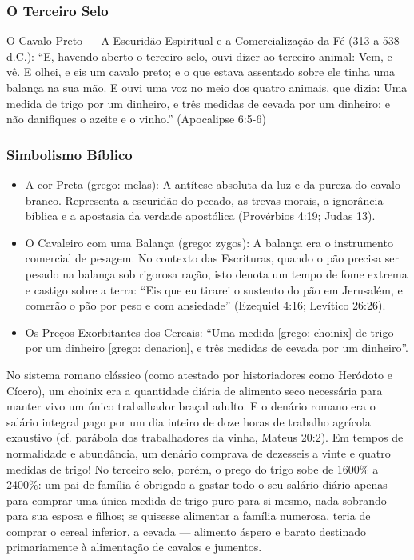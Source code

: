 \subsubsection*{O Terceiro Selo}
O Cavalo Preto — A Escuridão Espiritual e a Comercialização da Fé (313 a 538 d.C.):
``E, havendo aberto o terceiro selo, ouvi dizer ao terceiro animal: Vem, e vê. E olhei, e eis um cavalo preto; e o que estava assentado sobre ele tinha uma balança na sua mão. E ouvi uma voz no meio dos quatro animais, que dizia: Uma medida de trigo por um dinheiro, e três medidas de cevada por um dinheiro; e não danifiques o azeite e o vinho.'' (Apocalipse 6:5-6)


\subsubsection*{Simbolismo Bíblico}
\begin{itemize}
  \item A cor Preta (grego: melas): A antítese absoluta da luz e da pureza do cavalo branco. Representa a escuridão do pecado, as trevas morais, a ignorância bíblica e a apostasia da verdade apostólica (Provérbios 4:19; Judas 13).
  \item O Cavaleiro com uma Balança (grego: zygos): A balança era o instrumento comercial de pesagem. No contexto das Escrituras, quando o pão precisa ser pesado na balança sob rigorosa ração, isto denota um tempo de fome extrema e castigo sobre a terra: ``Eis que eu tirarei o sustento do pão em Jerusalém, e comerão o pão por peso e com ansiedade'' (Ezequiel 4:16; Levítico 26:26).
  \item Os Preços Exorbitantes dos Cereais: ``Uma medida [grego: choinix] de trigo por um dinheiro [grego: denarion], e três medidas de cevada por um dinheiro''.
\end{itemize}

No sistema romano clássico (como atestado por historiadores como Heródoto e Cícero), um choinix era a quantidade diária de alimento seco necessária para manter vivo um único trabalhador braçal adulto. E o denário romano era o salário integral pago por um dia inteiro de doze horas de trabalho agrícola exaustivo (cf. parábola dos trabalhadores da vinha, Mateus 20:2). Em tempos de normalidade e abundância, um denário comprava de dezesseis a vinte e quatro medidas de trigo! No terceiro selo, porém, o preço do trigo sobe de 1600\% a 2400\%: um pai de família é obrigado a gastar todo o seu salário diário apenas para comprar uma única medida de trigo puro para si mesmo, nada sobrando para sua esposa e filhos; se quisesse alimentar a família numerosa, teria de comprar o cereal inferior, a cevada — alimento áspero e barato destinado primariamente à alimentação de cavalos e jumentos.


